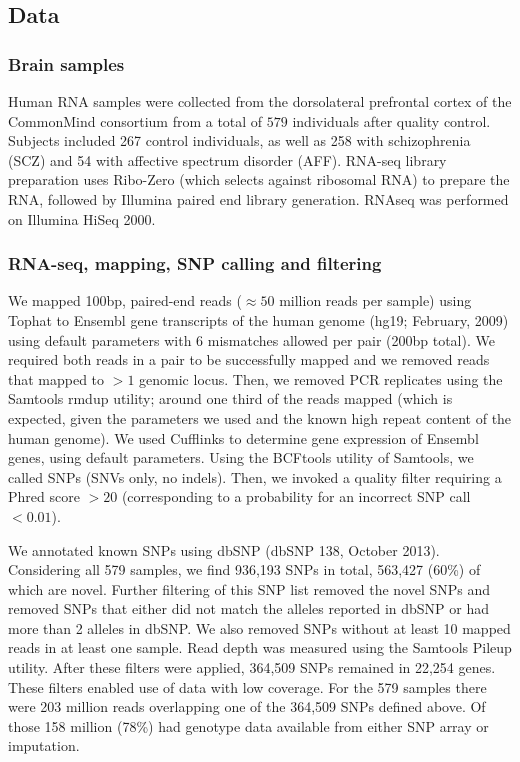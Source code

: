 \documentclass[letterpaper]{article}
\begin{document}
\subsection{Data}

\subsubsection{Brain samples}

Human RNA samples were collected from the dorsolateral prefrontal cortex of
the CommonMind consortium from a total of \(579\) individuals after
quality control. Subjects included 267 control individuals, as well as 258
with schizophrenia (SCZ) and 54 with affective spectrum disorder (AFF).
RNA-seq library preparation uses Ribo-Zero (which selects against ribosomal
RNA) to prepare the RNA, followed by Illumina paired end library generation.
RNAseq was performed on Illumina HiSeq 2000.

\subsubsection{RNA-seq, mapping, SNP calling and filtering}

We mapped 100bp, paired-end reads (\(\approx50\) million reads per sample) using Tophat
to Ensembl gene transcripts of the human genome (hg19; February, 2009) using
default parameters with 6 mismatches allowed per pair (200bp total). We
required both reads in a pair to be successfully mapped and we removed reads
that mapped to \(>1\) genomic locus. Then, we removed PCR replicates using the
Samtools rmdup utility; around one third of the reads mapped (which is
expected, given the parameters we used and the known high repeat content of
the human genome). We used Cufflinks to determine gene expression of Ensembl
genes, using default parameters. Using the BCFtools utility of Samtools, we
called SNPs (SNVs only, no indels). Then, we invoked a quality filter
requiring a Phred score \(>20\) (corresponding to a probability for an
incorrect SNP call \(<0.01\)).

We annotated known SNPs using dbSNP (dbSNP 138, October 2013). Considering all
579 samples, we find 936,193 SNPs in total, 563,427 (60\%) of which are novel.
Further filtering of this SNP list removed the novel SNPs and removed SNPs
that either did not match the alleles reported in dbSNP or had more than 2
alleles in dbSNP. We also removed SNPs without at least 10 mapped reads in at
least one sample. Read depth was measured using the Samtools Pileup utility.
After these filters were applied, 364,509 SNPs remained in 22,254 genes. These
filters enabled use of data with low coverage.  For the 579
samples there were 203 million reads overlapping one of the
364,509 SNPs defined above.  Of those 158 million (78\%) had genotype data
available from either SNP array or imputation.
\end{document}
